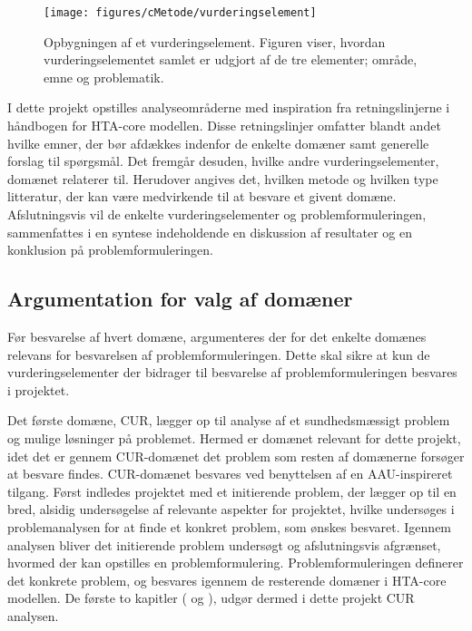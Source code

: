 \begin{figure}[H] 
\begin{center}
\texttt{[image: figures/cMetode/vurderingselement]}
\end{center}
\caption{Opbygningen af et vurderingselement. Figuren viser, hvordan vurderingselementet samlet er udgjort af de tre elementer; område, emne og problematik.}
\label{fig:vurderingselement} 
\end{figure}

I dette projekt opstilles analyseområderne med inspiration fra retningslinjerne i håndbogen for HTA-core modellen. Disse retningslinjer omfatter blandt andet hvilke emner, der bør afdækkes indenfor de enkelte domæner samt generelle forslag til spørgsmål. Det fremgår desuden, hvilke andre vurderingselementer, domænet relaterer til. Herudover angives det, hvilken metode og hvilken type litteratur, der kan være medvirkende til at besvare et givent domæne. \citep{HTAcore} \\
Afslutningsvis vil de enkelte vurderingselementer og problemformuleringen, sammenfattes i en syntese indeholdende en diskussion af resultater og en konklusion på problemformuleringen. 

\subsection{Argumentation for valg af domæner}
Før besvarelse af hvert domæne, argumenteres der for det enkelte domænes relevans for besvarelsen af problemformuleringen. Dette skal sikre at kun de vurderingselementer der bidrager til besvarelse af problemformuleringen besvares i projektet. 

Det første domæne, CUR, lægger op til analyse af et sundhedsmæssigt problem og mulige løsninger på problemet. Hermed er domænet relevant for dette projekt, idet det er gennem CUR-domænet det problem som resten af domænerne forsøger at besvare findes. CUR-domænet besvares ved benyttelsen af en AAU-inspireret tilgang. Først indledes projektet med et initierende problem, der lægger op til en bred, alsidig undersøgelse af relevante aspekter for projektet, hvilke undersøges i problemanalysen for at finde et konkret problem, som ønskes besvaret. Igennem analysen bliver det initierende problem undersøgt og afslutningsvis afgrænset, hvormed der kan opstilles en problemformulering. Problemformuleringen definerer det konkrete problem, og besvares igennem de resterende domæner i HTA-core modellen. De første to kapitler ( og ), udgør dermed i dette projekt CUR analysen. 

